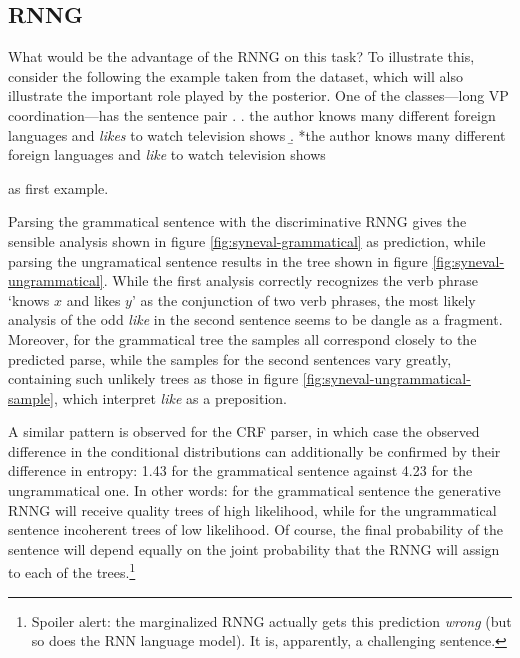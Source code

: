   \subsection{RNNG}
    What would be the advantage of the RNNG on this task? To illustrate this, consider the following the example taken from the dataset, which will also illustrate the important role played by the posterior. One of the classes---long VP coordination---has the sentence pair
    \exi. \a. the author knows many different foreign languages and \textit{likes} to watch television shows
      \b. *the author knows many different foreign languages and \textit{like} to watch television shows

    as first example.

    Parsing the grammatical sentence with the discriminative RNNG gives the sensible analysis shown in figure \ref{fig:syneval-grammatical} as prediction, while parsing the ungramatical sentence results in the tree shown in figure \ref{fig:syneval-ungrammatical}.     While the first analysis correctly recognizes the verb phrase `knows $x$ and likes $y$' as the conjunction of two verb phrases, the most likely analysis of the odd \textit{like} in the second sentence seems to be dangle as a fragment. Moreover, for the grammatical tree the samples all correspond closely to the predicted parse, while  the samples for the second sentences vary greatly, containing such unlikely trees as those in figure \ref{fig:syneval-ungrammatical-sample}, which interpret \textit{like} as a preposition.

    A similar pattern is observed for the CRF parser, in which case the observed difference in the conditional distributions can additionally be confirmed by their difference in entropy: 1.43 for the grammatical sentence against 4.23 for the ungrammatical one. In other words: for the grammatical sentence the generative RNNG will receive quality trees of high likelihood, while for the ungrammatical sentence incoherent trees of low likelihood. Of course, the final probability of the sentence will depend equally on the joint probability that the RNNG will assign to each of the trees.\footnote{Spoiler alert: the marginalized RNNG actually gets this prediction \textit{wrong} (but so does the RNN language model). It is, apparently, a challenging sentence.}

